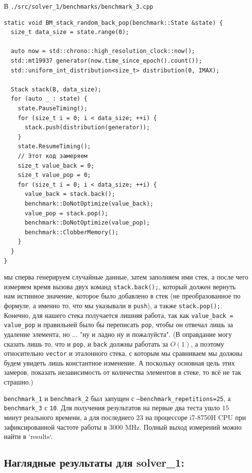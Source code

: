 В \texttt{./src/solver_1/benchmarks/benchmark_3.cpp}
\begin{verbatim}
static void BM_stack_random_back_pop(benchmark::State &state) {
  size_t data_size = state.range(0);

  auto now = std::chrono::high_resolution_clock::now();
  std::mt19937 generator(now.time_since_epoch().count());
  std::uniform_int_distribution<size_t> distribution(0, IMAX);

  Stack stack(B, data_size);
  for (auto _ : state) {
    state.PauseTiming();
    for (size_t i = 0; i < data_size; ++i) {
      stack.push(distribution(generator));
    }
    state.ResumeTiming();
    // Этот код замеряем
    size_t value_back = 0;
    size_t value_pop = 0;
    for (size_t i = 0; i < data_size; ++i) {
      value_back = stack.back();
      benchmark::DoNotOptimize(value_back);
      value_pop = stack.pop();
      benchmark::DoNotOptimize(value_pop);
      benchmark::ClobberMemory();
    }
  }
} 
\end{verbatim}
мы сперва генерируем случайные данные, затем заполняем ими стек, а после чего измеряем время вызова двух команд \texttt{stack.back();}, который должен вернуть нам истинное значение, которое было добавлено в стек (не преобразованное по формуле, а именно то, что мы указывали в \texttt{push}), а также \texttt{stack.pop();}. Конечно, для нашего стека получается лишняя работа, так как \texttt{value_back = value_pop} и правильней было бы переписать \texttt{pop}, чтобы он отвечал лишь за удаление элемента, но ... "ну и ладно ну и пожалуйста". (В оправдание могу сказать лишь то, что и \texttt{pop}, и \texttt{back} должны работать за $O(1)$, а поэтому относительно \texttt{vector} и эталонного стека, с которым мы сравниваем мы должны будем увидеть лишь константное изменение. А поскольку основная цель этих замеров, показать независимость от количества элементов в стеке, то всё не так страшно.)

\texttt{benchmark_1} и \texttt{benchmark_2} был запущен с \texttt{--benchmark_repetitions=25}, а \texttt{benchmark_3} с \texttt{10}. Для получения результатов на первые два теста ушло $15$ минут реального времени, а для последнего $23$ на процессоре i7-8750H CPU при зафиксированной частоте работы в $3000$ MHz. Полный выход измерений можно найти в `results`.

\subsection{Наглядные результаты для solver_1:}

